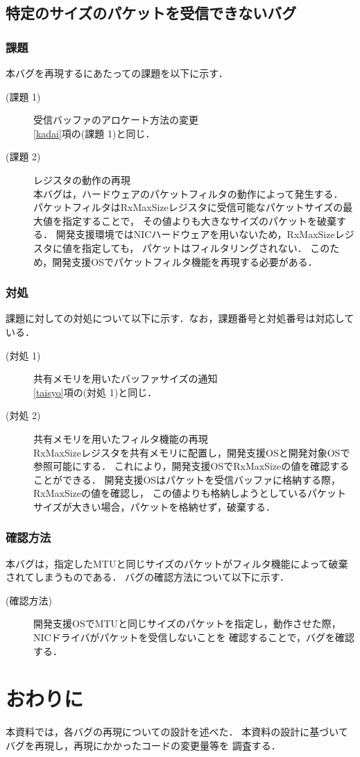 \documentclass[12pt]{jsarticle}
\begin{document}
\subsection{特定のサイズのパケットを受信できないバグ}
\subsubsection{課題}
本バグを再現するにあたっての課題を以下に示す．
\begin{description}
    \item[(課題 1)] 受信バッファのアロケート方法の変更\\
        \ref{kadai}項の(課題 1)と同じ．
    \item[(課題 2)] レジスタの動作の再現\\
        本バグは，ハードウェアのパケットフィルタの動作によって発生する．
        パケットフィルタはRxMaxSizeレジスタに受信可能なパケットサイズの最大値を指定することで，
        その値よりも大きなサイズのパケットを破棄する．
        開発支援環境ではNICハードウェアを用いないため，RxMaxSizeレジスタに値を指定しても，
        パケットはフィルタリングされない．
        このため，開発支援OSでパケットフィルタ機能を再現する必要がある．
\end{description}

\subsubsection{対処}
課題に対しての対処について以下に示す．なお，課題番号と対処番号は対応している．
\begin{description}
    \item[(対処 1)] 共有メモリを用いたバッファサイズの通知\\
        \ref{taisyo}項の(対処 1)と同じ．
    \item[(対処 2)] 共有メモリを用いたフィルタ機能の再現\\
        RxMaxSizeレジスタを共有メモリに配置し，開発支援OSと開発対象OSで参照可能にする．
        これにより，開発支援OSでRxMaxSizeの値を確認することができる．
        開発支援OSはパケットを受信バッファに格納する際，RxMaxSizeの値を確認し，
        この値よりも格納しようとしているパケットサイズが大きい場合，パケットを格納せず，破棄する．
\end{description}

\subsubsection{確認方法}
本バグは，指定したMTUと同じサイズのパケットがフィルタ機能によって破棄されてしまうものである．
バグの確認方法について以下に示す．
\begin{description}
    \item[(確認方法)] 
        開発支援OSでMTUと同じサイズのパケットを指定し，動作させた際，NICドライバがパケットを受信しないことを
        確認することで，バグを確認する．
\end{description}

\section{おわりに}
本資料では，各バグの再現についての設計を述べた．
本資料の設計に基づいてバグを再現し，再現にかかったコードの変更量等を
調査する．
\end{document}
